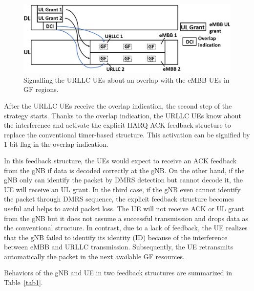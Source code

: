 \documentclass{ieeeaccess}
\begin{document}
\begin{figure}[htbp]
\centerline{\includegraphics[scale=0.28]{fig2.PNG}}
\caption{Signalling the URLLC UEs about an overlap with the eMBB UEs in GF regions.}
\label{fig2}
\vspace{-2mm}
\end{figure}

After the URLLC UEs receive the overlap indication, the second step of the strategy starts. Thanks to the overlap indication, the URLLC UEs know about the interference and activate the explicit HARQ ACK feedback structure to replace the conventional timer-based structure. This activation can be signified by 1-bit flag in the overlap indication. 

In this feedback structure, the UEs would expect to receive an ACK feedback from the gNB if data is decoded correctly at the gNB. On the other hand, if the gNB only can identify the packet by DMRS detection but cannot decode it, the UE will receive an UL grant. In the third case, if the gNB even cannot identify the packet through DMRS sequence, the explicit feedback structure becomes useful and helps to avoid packet loss. The UE will not receive ACK or UL grant from the gNB but it does not assume a successful transmission and drops data as the conventional structure. In contrast, due to a lack of feedback, the UE realizes that the gNB failed to identify its identity (ID) because of the interference between eMBB and URLLC transmission. Subsequently, the UE retransmits automatically the packet in the next available GF resources. 

Behaviors of the gNB and UE in two feedback structures are summarized in Table~\ref{tab1}.
\end{document}

